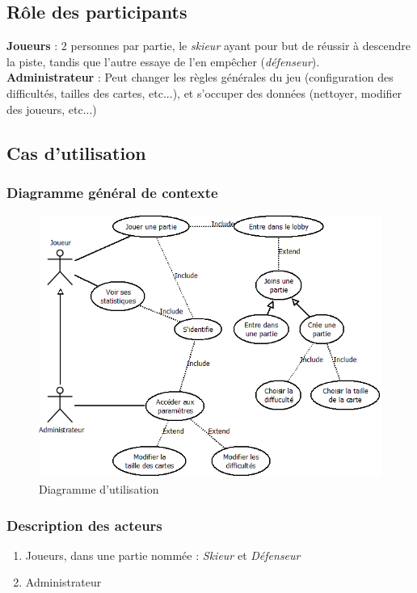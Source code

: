 \documentclass[a4paper,12pt]{article}
\begin{document}
	
	\subsection{Rôle des participants}
	\textbf{Joueurs} : 2 personnes par partie, le \textit{skieur} ayant pour but de réussir à descendre la piste, tandis que l'autre essaye de l'en empêcher (\textit{défenseur}). \\
	
	\textbf{Administrateur} : Peut changer les règles générales du jeu (configuration des difficultés, tailles des cartes, etc...), et s'occuper des données (nettoyer, modifier des joueurs, etc...)
	
	
	\subsection{Cas d'utilisation}
	
	\subsubsection{Diagramme général de contexte}
	\begin{figure}[!ht]
		\centering
		\includegraphics[scale=0.6]{diagramme_utilisation.png}
		\caption{Diagramme d'utilisation}
		\label{fig:diagramme_utilisation}
	\end{figure}
	
	\subsubsection{Description des acteurs}
	\begin{enumerate}
		\item Joueurs, dans une partie nommée : \textit{Skieur} et \textit{Défenseur}
		\item Administrateur
	\end{enumerate}
	
\end{document}

